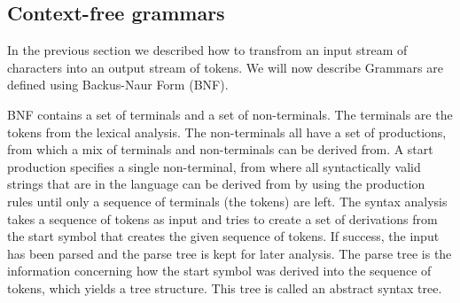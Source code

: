 \subsection{Context-free grammars}
\label{sec:context-freegrammars}
In the previous section we described how to transfrom an input stream of
characters into an output stream of tokens. We will now describe
Grammars are defined using Backus-Naur Form (BNF).

BNF contains a set of terminals and a set of non-terminals. The terminals are
the tokens from the lexical analysis. The non-terminals all have a set of
productions, from which a mix of terminals and non-terminals can be derived
from. A start production specifies a single non-terminal, from where all
syntactically valid strings that are in the language can be derived from by
using the production rules until only a sequence of terminals (the tokens) are
left. The syntax analysis takes a sequence of tokens as input and tries to
create a set of derivations from the start symbol that creates the given
sequence of tokens. If success, the input has been parsed and the parse tree is
kept for later analysis. The parse tree is the information concerning how the
start symbol was derived into the sequence of tokens, which yields a tree
structure. This tree is called an abstract syntax tree.

\begin{ebnf}
\galt{\gter{>}}
\galt{\gter{<}}
\end{ebnf}

